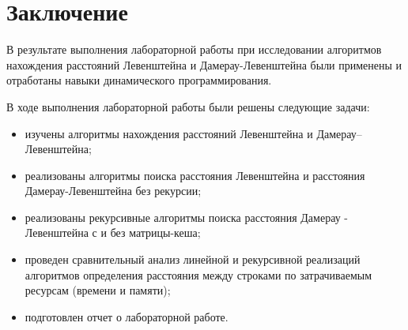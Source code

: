 \chapter*{Заключение}

В результате выполнения лабораторной работы при исследовании алгоритмов нахождения расстояний Левенштейна и Дамерау-Левенштейна были применены и отработаны навыки динамического программирования.

В ходе выполнения лабораторной работы были решены следующие задачи:

\begin{itemize}
    \item изучены алгоритмы нахождения расстояний Левенштейна и Дамерау--Левенштейна;
	\item реализованы алгоритмы поиска расстояния Левенштейна и расстояния Дамерау-Левенштейна без рекурсии;
	\item реализованы рекурсивные алгоритмы поиска расстояния Дамерау - Левенштейна с и без матрицы-кеша;
	\item проведен сравнительный анализ линейной и рекурсивной реализаций алгоритмов определения расстояния между строками по затрачиваемым ресурсам (времени и памяти);
	\item подготовлен отчет о лабораторной работе.
\end{itemize}